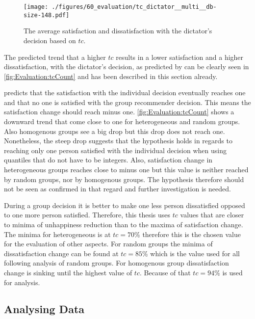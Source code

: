 \begin{figure}
    \centering
    \texttt{[image: ./figures/60\_evaluation/tc\_dictator\_\_multi\_\_db-size-148.pdf]}
    \caption{The average satisfaction and dissatisfaction with the dictator's decision based on $tc$.}
    \label{fig:Evaluation:tcCount}
\end{figure}

The predicted trend that a higher $tc$ results in a lower satisfaction and a higher dissatisfaction, with the dictator's decision, as predicted by  can be clearly seen in \autoref{fig:Evaluation:tcCount} and has been described in this section already.

 predicts that the satisfaction with the individual decision eventually reaches one and that no one is satisfied with the group recommender decision. This means the satisfaction change should reach minus one. \autoref{fig:Evaluation:tcCount} shows a downward trend that come close to one for heterogeneous and random groups. Also homogenous groups see a big drop but this drop does not reach one. Nonetheless, the steep drop suggests that the hypothesis holds in regards to reaching only one person satisfied with the individual decision when using quantiles that do not have to be integers. Also, satisfaction change in heterogeneous groups reaches close to minus one but this value is neither reached by random groups, nor by homogenous groups. The hypothesis therefore should not be seen as confirmed in that regard and further investigation is needed.

During a group decision it is better to make one less person dissatisfied opposed to one more person satisfied. Therefore, this thesis uses $tc$ values that are closer to minima of unhappiness reduction than to the maxima of satisfaction change. The minima for heterogeneous is at $tc = 70\%$ therefore this is the chosen value for the evaluation of other aspects. For random groups the minima of dissatisfaction change can be found at $tc = 85\%$ which is the value used for all following analysis of random groups. For homogenous group dissatisfaction change is sinking until the highest value of $tc$. Because of that $tc = 94\%$ is used for analysis.

\subsection{Analysing Data}

